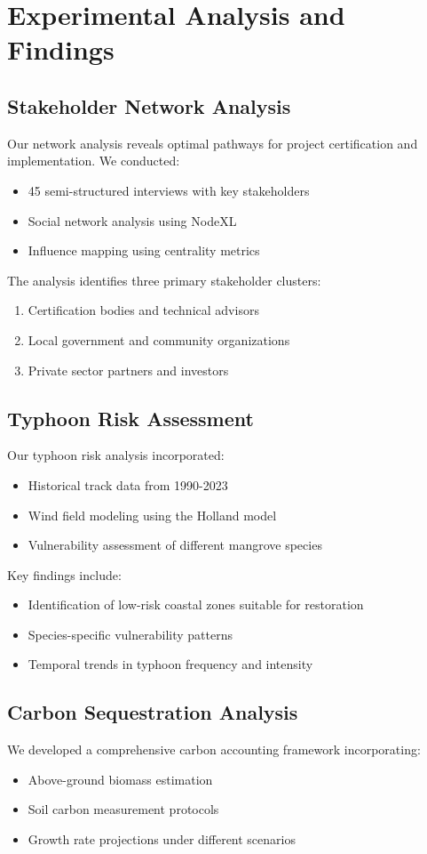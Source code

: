 \documentclass{article}
\theoremstyle{plain}
\theoremstyle{definition}
\theoremstyle{remark}
\begin{document}
\section{Experimental Analysis and Findings}

\subsection{Stakeholder Network Analysis}
Our network analysis reveals optimal pathways for project certification and implementation. We conducted:
\begin{itemize}
\item 45 semi-structured interviews with key stakeholders
\item Social network analysis using NodeXL
\item Influence mapping using centrality metrics
\end{itemize}

The analysis identifies three primary stakeholder clusters:
\begin{enumerate}
\item Certification bodies and technical advisors
\item Local government and community organizations
\item Private sector partners and investors
\end{enumerate}

\subsection{Typhoon Risk Assessment}
Our typhoon risk analysis incorporated:
\begin{itemize}
\item Historical track data from 1990-2023
\item Wind field modeling using the Holland model
\item Vulnerability assessment of different mangrove species
\end{itemize}

Key findings include:
\begin{itemize}
\item Identification of low-risk coastal zones suitable for restoration
\item Species-specific vulnerability patterns
\item Temporal trends in typhoon frequency and intensity
\end{itemize}

\subsection{Carbon Sequestration Analysis}
We developed a comprehensive carbon accounting framework incorporating:
\begin{itemize}
\item Above-ground biomass estimation
\item Soil carbon measurement protocols
\item Growth rate projections under different scenarios
\end{itemize}
\end{document}
